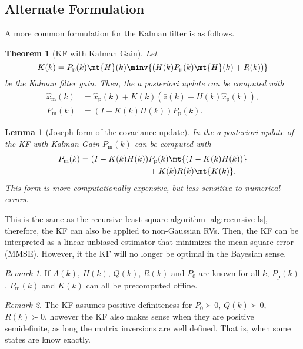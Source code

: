 \documentclass[margin=tiny]{hsrzf}
\theoremstyle{plain}
\newtheorem{thm}{Theorem}[section]
\newtheorem{lemma}{Lemma}[section]
\theoremstyle{definition}
\theoremstyle{remark}
\newtheorem*{remark}{Remark}
\begin{document}
\subsection{Alternate Formulation}

A more common formulation for the Kalman filter is as follows.

\begin{thm}[KF with Kalman Gain]
  Let
  \[
    K(k) = P_\mathrm{p}(k) \mt{H}(k) \minv{(
      H(k) P_\mathrm{p}(k) \mt{H}(k) + R(k)
    )}
  \]
  be the Kalman filter gain. Then, the a posteriori update can be computed
  with
  \begin{align*}
    \hat{x}_\mathrm{m}(k) &= \hat{x}_\mathrm{p}(k) + K(k)(
      \bar{z}(k) - H(k) \hat{x}_\mathrm{p}(k)
    ), \\
    P_\mathrm{m}(k) &= (I - K(k) H(k)) P_\mathrm{p}(k).
  \end{align*}
\end{thm}

\begin{lemma}[Joseph form of the covariance update]
  In the a posteriori update of the KF with Kalman Gain $P_\mathrm{m}(k)$ can
  be computed with
  \begin{align*}
    P_\mathrm{m}(k) = (I - K(k) H(k)) 
      &P_\mathrm{p}(k) \mt{(I - K(k) H(k))} \\
      &+ K(k) R(k) \mt{K(k)}.
  \end{align*}
  This form is more computationally expensive, but less sensitive to numerical
  errors.
\end{lemma}


This is the same as the recursive least square algorithm
\ref{alg:recursive-ls}, therefore, the KF can also be applied to non-Gaussian
RVs. Then, the KF can be interpreted as a linear unbiased estimator that
minimizes the mean square error (MMSE). However, it the KF will no longer be
optimal in the Bayesian sense.

\begin{remark}
  If $A(k)$, $H(k)$, $Q(k)$, $R(k)$ and $P_0$ are known for all $k$,
  $P_\mathrm{p}(k)$, $P_\mathrm{m}(k)$ and $K(k)$ can all be precomputed
  offline.
\end{remark}

\begin{remark}
  The KF assumes positive definiteness for $P_0 \succ 0$, $Q(k) \succ 0$,
  $R(k) \succ 0$, however the KF also makes sense when they are positive
  semidefinite, as long the matrix inversions are well defined. That is, when
  some states are know exactly.
\end{remark}
\end{document}
